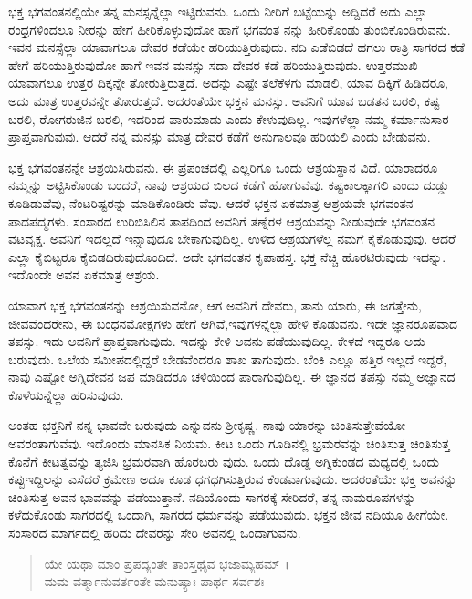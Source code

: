 ಭಕ್ತ ಭಗವಂತನಲ್ಲಿಯೇ ತನ್ನ ಮನಸ್ಸನ್ನೆಲ್ಲಾ ಇಟ್ಟಿರುವನು. ಒಂದು ನೀರಿಗೆ ಬಟ್ಟೆಯನ್ನು ಅದ್ದಿದರೆ ಅದು ಎಲ್ಲಾ ರಂಧ್ರಗಳಿಂದಲೂ ನೀರನ್ನು ಹೇಗೆ ಹೀರಿಕೊಳ್ಳುವುದೋ ಹಾಗೆ ಭಗವಂತ ನನ್ನು ಹೀರಿಕೊಂಡು ತುಂಬಿಕೊಂಡಿರುವನು. ಇವನ ಮನಸ್ಸೆಲ್ಲಾ ಯಾವಾಗಲೂ ದೇವರ ಕಡೆಯೇ ಹರಿಯುತ್ತಿರುವುದು. ನದಿ ಎಡೆಬಿಡದೆ ಹಗಲು ರಾತ್ರಿ ಸಾಗರದ ಕಡೆ ಹೇಗೆ ಹರಿಯುತ್ತಿರುವುದೋ ಹಾಗೆ ಇವನ ಮನಸ್ಸು ಸದಾ ದೇವರ ಕಡೆ ಹರಿಯುತ್ತಿರುವುದು. ಉತ್ತರಮುಖಿ ಯಾವಾಗಲೂ ಉತ್ತರ ದಿಕ್ಕನ್ನೇ ತೋರುತ್ತಿರುತ್ತದೆ. ಅದನ್ನು ಎಷ್ಟೇ ತಲೆಕೆಳಗು ಮಾಡಲಿ, ಯಾವ ದಿಕ್ಕಿಗೆ ಹಿಡಿದರೂ, ಅದು ಮಾತ್ರ ಉತ್ತರವನ್ನೇ ತೋರುತ್ತದೆ. ಅದರಂತೆಯೇ ಭಕ್ತನ ಮನಸ್ಸು. ಅವನಿಗೆ ಯಾವ ಬಡತನ ಬರಲಿ, ಕಷ್ಟ ಬರಲಿ, ರೋಗರುಜಿನ ಬರಲಿ, ಇದರಿಂದ ಪಾರುಮಾಡು ಎಂದು ಕೇಳುವುದಿಲ್ಲ. ಇವುಗಳೆಲ್ಲಾ ನಮ್ಮ ಕರ್ಮಾನುಸಾರ ಪ್ರಾಪ್ತವಾಗುವುವು. ಆದರೆ ನನ್ನ ಮನಸ್ಸು ಮಾತ್ರ ದೇವರ ಕಡೆಗೆ ಅನುಗಾಲವೂ ಹರಿಯಲಿ ಎಂದು ಬೇಡುವನು.

ಭಕ್ತ ಭಗವಂತನನ್ನೇ ಆಶ್ರಯಿಸಿರುವನು. ಈ ಪ್ರಪಂಚದಲ್ಲಿ ಎಲ್ಲರಿಗೂ ಒಂದು ಆಶ್ರಯಸ್ಥಾನ ವಿದೆ. ಯಾರಾದರೂ ನಮ್ಮನ್ನು ಅಟ್ಟಿಸಿಕೊಂಡು ಬಂದರೆ, ನಾವು ಆಶ್ರಯದ ಬಿಲದ ಕಡೆಗೆ ಹೋಗುವೆವು. ಕಷ್ಟಕಾಲಕ್ಕಾಗಲಿ ಎಂದು ದುಡ್ಡು ಕೂಡಿಡುವೆವು, ನೆಂಟರಿಷ್ಟರನ್ನು ಮಾಡಿಕೊಂಡಿರು ವೆವು. ಆದರೆ ಭಕ್ತನ ಏಕಮಾತ್ರ ಆಶ್ರಯವೇ ಭಗವಂತನ ಪಾದಪದ್ಮಗಳು. ಸಂಸಾರದ ಉರಿಬಿಸಿಲಿನ ತಾಪದಿಂದ ಅವನಿಗೆ ತಣ್ನೆರಳ ಆಶ್ರಯವನ್ನು ನೀಡುವುದೇ ಭಗವಂತನ ವಟವೃಕ್ಷ. ಅವನಿಗೆ ಇದಲ್ಲದೆ ಇನ್ನಾವುದೂ ಬೇಕಾಗುವುದಿಲ್ಲ. ಉಳಿದ ಆಶ್ರಯಗಳೆಲ್ಲ ನಮಗೆ ಕೈಕೊಡುವುವು. ಆದರೆ ಎಲ್ಲಾ ಕೈಬಿಟ್ಟರೂ ಕೈಬಿಡದಿರುವುದೊಂದಿದೆ. ಅದೇ ಭಗವಂತನ ಕೃಪಾಹಸ್ತ. ಭಕ್ತ ನೆಚ್ಚಿ ಹೊರಟಿರುವುದು ಇದನ್ನು. ಇದೊಂದೇ ಅವನ ಏಕಮಾತ್ರ ಆಶ್ರಯ.

ಯಾವಾಗ ಭಕ್ತ ಭಗವಂತನನ್ನು ಆಶ್ರಯಿಸುವನೋ, ಆಗ ಅವನಿಗೆ ದೇವರು, ತಾನು ಯಾರು, ಈ ಜಗತ್ತೇನು, ಜೀವವೆಂದರೇನು, ಈ ಬಂಧನಮೋಕ್ಷಗಳು ಹೇಗೆ ಆಗಿವೆ,ಇವುಗಳನ್ನೆಲ್ಲಾ ಹೇಳಿ ಕೊಡುವನು. ಇದೇ ಜ್ಞಾನರೂಪವಾದ ತಪಸ್ಸು. ಇದು ಅವನಿಗೆ ಪ್ರಾಪ್ತವಾಗುವುದು. ಇದನ್ನು ಕೇಳಿ ಅವನು ಪಡೆಯುವುದಿಲ್ಲ. ಕೇಳದೆ ಇದ್ದರೂ ಅದು ಬರುವುದು. ಒಲೆಯ ಸಮೀಪದಲ್ಲಿದ್ದರೆ ಬೇಡವೆಂದರೂ ಶಾಖ ತಾಗುವುದು. ಬೆಂಕಿ ಎಲ್ಲೂ ಹತ್ತಿರ ಇಲ್ಲದೆ ಇದ್ದರೆ, ನಾವು ಎಷ್ಟೋ ಅಗ್ನಿದೇವನ ಜಪ ಮಾಡಿದರೂ ಚಳಿಯಿಂದ ಪಾರಾಗುವುದಿಲ್ಲ. ಈ ಜ್ಞಾನದ ತಪಸ್ಸು ನಮ್ಮ ಅಜ್ಞಾನದ ಕೊಳೆಯನ್ನೆಲ್ಲಾ ಹರಿಸುವುದು.

ಅಂತಹ ಭಕ್ತನಿಗೆ ನನ್ನ ಭಾವವೇ ಬರುವುದು ಎನ್ನುವನು ಶ್ರೀಕೃಷ್ಣ. ನಾವು ಯಾರನ್ನು ಚಿಂತಿಸುತ್ತೇವೆಯೋ ಅವರಂತಾಗುವೆವು. ಇದೊಂದು ಮಾನಸಿಕ ನಿಯಮ. ಕೀಟ ಒಂದು ಗೂಡಿನಲ್ಲಿ ಭ್ರಮರವನ್ನು ಚಿಂತಿಸುತ್ತ ಚಿಂತಿಸುತ್ತ ಕೊನೆಗೆ ಕೀಟತ್ವವನ್ನು ತ್ಯಜಿಸಿ ಭ್ರಮರವಾಗಿ ಹೊರಬರು ವುದು. ಒಂದು ದೊಡ್ಡ ಅಗ್ನಿಕುಂಡದ ಮಧ್ಯದಲ್ಲಿ ಒಂದು ಕಪ್ಪುಇದ್ದಿಲನ್ನು ಎಸೆದರೆ ಕ್ರಮೇಣ ಅದೂ ಕೂಡ ಧಗಧಗಿಸುತ್ತಿರುವ ಕೆಂಡವಾಗುವುದು. ಅದರಂತೆಯೇ ಭಕ್ತ ಅವನನ್ನು ಚಿಂತಿಸುತ್ತ ಅವನ ಭಾವವನ್ನು ಪಡೆಯುತ್ತಾನೆ. ನದಿಯೊಂದು ಸಾಗರಕ್ಕೆ ಸೇರಿದರೆ, ತನ್ನ ನಾಮರೂಪಗಳನ್ನು ಕಳೆದುಕೊಂಡು ಸಾಗರದಲ್ಲಿ ಒಂದಾಗಿ, ಸಾಗರದ ಧರ್ಮವನ್ನು ಪಡೆಯುವುದು. ಭಕ್ತನ ಜೀವ ನದಿಯೂ ಹೀಗೆಯೇ. ಸಂಸಾರದ ಮಾರ್ಗದಲ್ಲಿ ಹರಿದು ದೇವರನ್ನು ಸೇರಿ ಅವನಲ್ಲಿ ಒಂದಾಗುವನು.

\begin{verse}
ಯೇ ಯಥಾ ಮಾಂ ಪ್ರಪದ್ಯಂತೇ ತಾಂಸ್ತಥೈವ ಭಜಾಮ್ಯಹಮ್ ।\\ಮಮ ವರ್ತ್ಮಾನುವರ್ತಂತೇ ಮನುಷ್ಯಾಃ ಪಾರ್ಥ ಸರ್ವಶಃ 
\end{verse}


